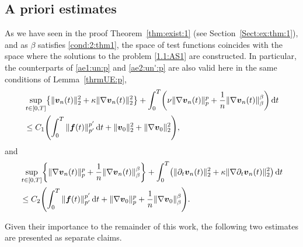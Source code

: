 \documentclass[12pt,reqno]{amsart}
\numberwithin{equation}{section}
\let\originalleft\left
\let\originalright\right
\renewcommand{\left}{\mathopen{}\mathclose\bgroup\originalleft}
\renewcommand{\right}{\aftergroup\egroup\originalright}
\theoremstyle{definition}
\def\dt{\,\mathrm{d}t}
\def\vv{\boldsymbol{v}}
\def\f{\boldsymbol{f}}
\begin{document}
\subsection{A priori estimates}
{
As we have seen in the proof Theorem~\ref{thm:exist:1} (see Section~\ref{Sect:ex:thm:1}), and as $\beta$ satisfies \eqref{cond:2:thm1}, the space of test functions coincides with the space where the solutions to the problem \eqref{1.1:AS1} are constructed.
In particular, the counterparts of \eqref{ae1:un:p} and \eqref{ae2:un':p} are also valid here in the same conditions of Lemma~\ref{thrmUE:p}, }
\begin{equation}\label{ae1:un}
\begin{split}
&
\sup_{t\in[0,T]}\left\{\|\vv_n(t)\|^2_{2} + \kappa\|\nabla\vv_n(t)\|_{2}^2\right\} + \int_0^T\left(\nu\|\nabla\vv_n(t)\|^p_{p}+
\frac{1}{n}\|\nabla\vv_n(t)\|^\beta_{\beta}\right)\dt
 \\
&\leq C_1\left(\int_0^T\|\f(t)\|^{p'}_{p'}\dt + \|\vv_0\|^2_{2} + \|\nabla\vv_0\|_{2}^2 \right),
\end{split}
\end{equation}
and
\begin{equation} \label{ae2:un'}
\begin{split}
&
 \sup_{t\in[0,T]}\left\{\|\nabla\vv_n(t)\|^p_{p}+\frac{1}{n}\|\nabla\vv_n(t)\|^\beta_{\beta}\right\} +
\int_0^T\left(\|{\partial_t\vv_{n}}(t)\|_{2}^2+\kappa\|\nabla{\partial_t\vv_{n}}(t)\|^2_{2}\right)\dt
\\
& \leq C_2\left(\int_0^T\|\f(t)\|^{p'}_{p'}\dt + \|\nabla\vv_0\|^p_{p} + \frac{1}{n}\|\nabla\vv_0\|^\beta_{\beta} \right).
\end{split}
\end{equation}

Given their importance to the remainder of this work, the following two estimates are presented as separate claims.
\end{document}

